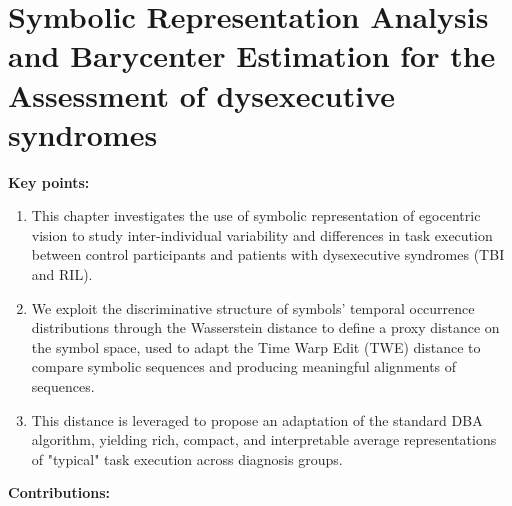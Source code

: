 \chapter[Symbolic representation analysis and barycenter estimation]{Symbolic Representation Analysis and Barycenter Estimation for the Assessment of dysexecutive syndromes}
\label{sec:chapter_6}

\begin{chapterabstract}


    \textbf{Key points:}
    \begin{enumerate}
        \item This chapter investigates the use of symbolic representation of egocentric vision to study inter-individual variability and differences in task execution between control participants and patients with dysexecutive syndromes (TBI and RIL).

        \item We exploit the discriminative structure of symbols’ temporal occurrence distributions through the Wasserstein distance to define a proxy distance on the symbol space, used to adapt the Time Warp Edit (TWE) distance to compare symbolic sequences and producing meaningful alignments of sequences.

        \item This distance is leveraged to propose an adaptation of the standard DBA algorithm, yielding rich, compact, and interpretable average representations of "typical" task execution across diagnosis groups. 


    \end{enumerate}

    \textbf{Contributions:}
    \begin{enumerate}

        

\end{enumerate}
\end{chapterabstract}
